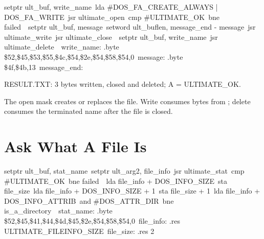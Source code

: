 \begin{listingbox}
\hspace*{2em}setptr ult\_buf, write\_name\
\hspace*{2em}lda \#DOS\_FA\_CREATE\_ALWAYS | DOS\_FA\_WRITE\
\hspace*{2em}jsr ultimate\_open\
\hspace*{2em}cmp \#ULTIMATE\_OK\
\hspace*{2em}bne failed\
\
\hspace*{2em}setptr ult\_buf, message\
\hspace*{2em}setword ult\_buflen, message\_end - message\
\hspace*{2em}jsr ultimate\_write\
\hspace*{2em}jsr ultimate\_close\
\
\hspace*{2em}setptr ult\_buf, write\_name\
\hspace*{2em}jsr ultimate\_delete\
\
write\_name: .byte \$52,\$45,\$53,\$55,\$4c,\$54,\$2e,\$54,\$58,\$54,0\
message:    .byte \$4f,\$4b,13\
message\_end:
\end{listingbox}

\begin{resultbox}
RESULT.TXT: 3 bytes written, closed and deleted; A = ULTIMATE_OK.
\end{resultbox}

The open mask creates or replaces the file. Write consumes
\cmd{ult\_buflen} bytes from ; delete consumes the terminated
name after the file is closed.


\section{Ask What A File Is}

\begin{listingbox}
\hspace*{2em}setptr ult\_buf, stat\_name\
\hspace*{2em}setptr ult\_arg2, file\_info\
\hspace*{2em}jsr ultimate\_stat\
\hspace*{2em}cmp \#ULTIMATE\_OK\
\hspace*{2em}bne failed\
\
\hspace*{2em}lda file\_info + DOS\_INFO\_SIZE\
\hspace*{2em}sta file\_size\
\hspace*{2em}lda file\_info + DOS\_INFO\_SIZE + 1\
\hspace*{2em}sta file\_size + 1\
\hspace*{2em}lda file\_info + DOS\_INFO\_ATTRIB\
\hspace*{2em}and \#DOS\_ATTR\_DIR\
\hspace*{2em}bne is\_a\_directory\
\
stat\_name: .byte \$52,\$45,\$41,\$44,\$4d,\$45,\$2e,\$54,\$58,\$54,0\
file\_info: .res ULTIMATE\_FILEINFO\_SIZE\
file\_size: .res 2
\end{listingbox}

